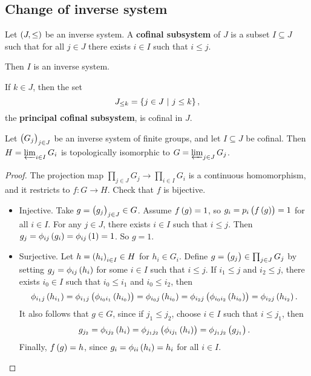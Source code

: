\subsection{Change of inverse system}

\begin{definition*}
Let $ \br{J, \le} $ be an inverse system. A \textbf{cofinal subsystem} of $ J $ is a subset $ I \subseteq J $ such that for all $ j \in J $ there exists $ i \in I $ such that $ i \le j $.
\end{definition*}

Then $ I $ is an inverse system.

\begin{example*}
If $ k \in J $, then the set
$$ J_{\le k} = \cbr{j \in J \st j \le k}, $$
the \textbf{principal cofinal subsystem}, is cofinal in $ J $.
\end{example*}

\begin{proposition}
Let $ \br{G_j}_{j \in J} $ be an inverse system of finite groups, and let $ I \subseteq J $ be cofinal. Then $ H = \varprojlim_{i \in I} G_i $ is topologically isomorphic to $ G = \varprojlim_{j \in J} G_j $.
\end{proposition}

\begin{proof}
The projection map $ \prod_{j \in J} G_j \to \prod_{i \in I} G_i $ is a continuous homomorphism, and it restricts to $ f : G \to H $. Check that $ f $ is bijective.
\begin{itemize}
\item Injective. Take $ g = \br{g_j}_{j \in J} \in G $. Assume $ f\br{g} = 1 $, so $ g_i = p_i\br{f\br{g}} = 1 $ for all $ i \in I $. For any $ j \in J $, there exists $ i \in I $ such that $ i \le j $. Then $ g_j = \phi_{ij}\br{g_i} = \phi_{ij}\br{1} = 1 $. So $ g = 1 $.
\item Surjective. Let $ h = \br{h_i}_{i \in I} \in H $ for $ h_i \in G_i $. Define $ g = \br{g_j} \in \prod_{j \in J} G_j $ by setting $ g_j = \phi_{ij}\br{h_i} $ for some $ i \in I $ such that $ i \le j $. If $ i_1 \le j $ and $ i_2 \le j $, there exists $ i_0 \in I $ such that $ i_0 \le i_1 $ and $ i_0 \le i_2 $, then
$$ \phi_{i_1j}\br{h_{i_1}} = \phi_{i_1j}\br{\phi_{i_0i_1}\br{h_{i_0}}} = \phi_{i_0j}\br{h_{i_0}} = \phi_{i_2j}\br{\phi_{i_0i_2}\br{h_{i_0}}} = \phi_{i_2j}\br{h_{i_2}}. $$
It also follows that $ g \in G $, since if $ j_1 \le j_2 $, choose $ i \in I $ such that $ i \le j_1 $, then
$$ g_{j_2} = \phi_{ij_2}\br{h_i} = \phi_{j_1j_2}\br{\phi_{ij_1}\br{h_i}} = \phi_{j_1j_2}\br{g_{j_1}}. $$
Finally, $ f\br{g} = h $, since $ g_i = \phi_{ii}\br{h_i} = h_i $ for all $ i \in I $.
\end{itemize}
\end{proof}

